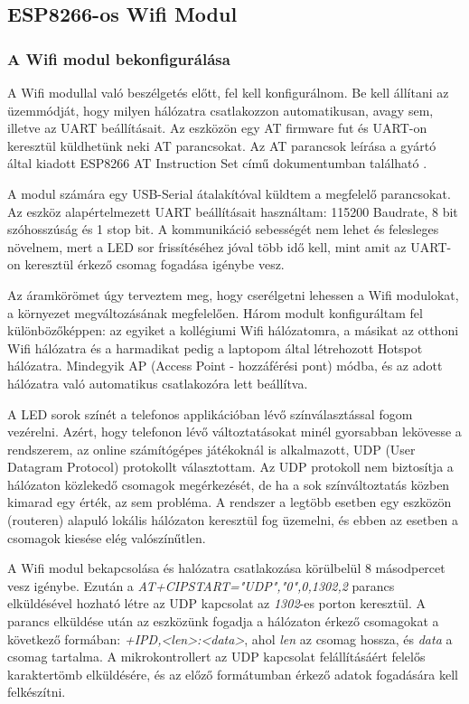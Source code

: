 \documentclass[../main.tex]{subfiles}
\begin{document}
    \subsection{ESP8266-os Wifi Modul}
        \subsubsection{A Wifi modul bekonfigurálása}
            A Wifi modullal való beszélgetés előtt, fel kell konfigurálnom. Be kell állítani az üzemmódját, hogy milyen hálózatra csatlakozzon automatikusan, avagy sem, illetve az UART beállításait. Az eszközön egy AT firmware fut és UART-on keresztül küldhetünk neki AT parancsokat. Az AT parancsok leírása a gyártó által kiadott ESP8266 AT Instruction Set című dokumentumban található \cite{esp_at_inst_set}.
            
            A modul számára egy USB-Serial átalakítóval küldtem a megfelelő parancsokat. Az eszköz alapértelmezett UART beállításait használtam: 115200 Baudrate, 8 bit szóhosszúság és 1 stop bit. A kommunikáció sebességét nem lehet és felesleges növelnem, mert a LED sor frissítéséhez jóval több idő kell, mint amit az UART-on keresztül érkező csomag fogadása igénybe vesz.
            
            Az áramkörömet úgy terveztem meg, hogy cserélgetni lehessen a Wifi modulokat, a környezet megváltozásának megfelelően. Három modult konfiguráltam fel különbözőképpen: az egyiket a kollégiumi Wifi hálózatomra, a másikat az otthoni Wifi hálózatra és a harmadikat pedig a laptopom által létrehozott Hotspot hálózatra. Mindegyik AP (Access Point - hozzáférési pont) módba, és az adott hálózatra való automatikus csatlakozóra lett beállítva.
            
            A LED sorok színét a telefonos applikációban lévő színválasztással fogom vezérelni. Azért, hogy telefonon lévő változtatásokat minél gyorsabban lekövesse a rendszerem, az online számítógépes játékoknál is alkalmazott, UDP (User Datagram Protocol) protokollt választottam. Az UDP protokoll nem biztosítja a hálózaton közlekedő csomagok megérkezését, de ha a sok színváltoztatás közben kimarad egy érték, az sem probléma. A rendszer a legtöbb esetben egy eszközön (routeren) alapuló lokális hálózaton keresztül fog üzemelni, és ebben az esetben a csomagok kiesése elég valószínűtlen.
            
            A Wifi modul bekapcsolása és halózatra csatlakozása körülbelül 8 másodpercet vesz igénybe. Ezután a \textit{AT+CIPSTART="UDP","0",0,1302,2} parancs elküldésével hozható létre az UDP kapcsolat az \textit{1302}-es porton keresztül. A parancs elküldése után az eszközünk fogadja a hálózaton érkező csomagokat a következő formában: \textit{+IPD,<len>:<data>}, ahol \textit{len} az csomag hossza, és \textit{data} a csomag tartalma. A mikrokontrollert az UDP kapcsolat felállításáért felelős karaktertömb elküldésére, és az előző formátumban érkező adatok fogadására kell felkészítni. 
        
\end{document}
